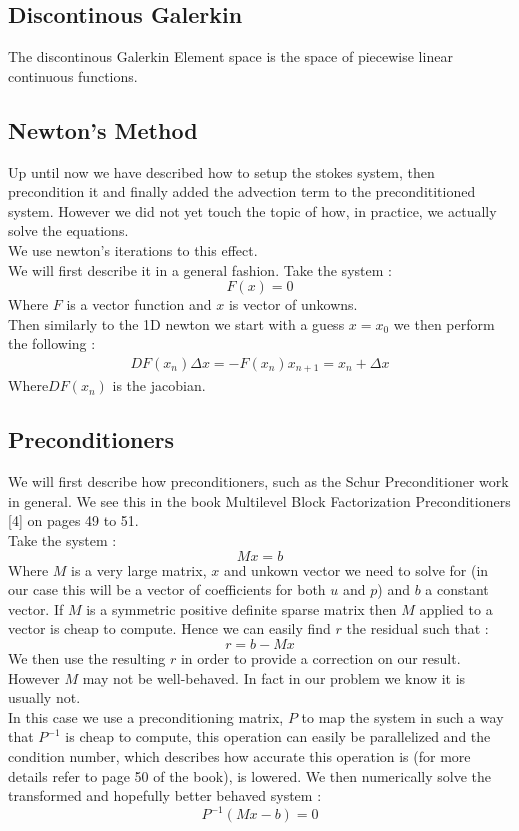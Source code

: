 \documentclass[11pt,twoside,a4paper]{article}
\begin{document}
\subsection{Discontinous Galerkin}
The discontinous Galerkin Element space is the space of piecewise linear continuous functions.

\subsection{Newton's Method}
Up until now we have described how to setup the stokes system, then precondition it and finally added the advection term to the precondititioned system. However we did not yet touch the topic of how, in practice, we actually solve the equations.\\
We use newton's iterations to this effect.\\
We will first describe it in a general fashion. Take the system :
$$
F(x) = 0
$$
Where $F$ is a vector function and $x$ is vector of unkowns.\\
Then similarly to the 1D newton we start with a guess $x = x_0$ we then perform the following :
\begin{align}
DF(x_n) \Delta x = - F(x_n)
x_{n+1} = x_n + \Delta x 
\end{align}
Where$DF(x_n)$ is the jacobian.

\subsection{Preconditioners}

We will first describe how preconditioners, such as the Schur Preconditioner work in general. We see this in the book Multilevel Block Factorization Preconditioners [4] on pages 49 to 51.\\
Take the system :\\
$$
Mx = b
$$
Where $M$ is a very large matrix, $x$ and unkown vector we need to solve for (in our case this will be a vector of coefficients for both $u$ and $p$) and $b$ a constant vector. If $M$ is a symmetric positive definite sparse matrix then $M$ applied to a vector is cheap to compute. Hence we can easily find $r$ the residual such that :\\
$$
r = b - Mx
$$
We then use the resulting $r$ in order to provide a correction on our result.\\
However $M$ may not be well-behaved. In fact in our problem we know it is usually not.\\
In this case we use a preconditioning matrix, $P$ to map the system in such a way that $P^{-1}$ is cheap to compute, this operation can easily be parallelized and the condition number, which describes how accurate this operation is (for more details refer to page 50 of the book), is lowered.
We then numerically solve the transformed and hopefully better behaved system : 
$$
P^{-1}(Mx-b) = 0
$$ 
 
\end{document}
